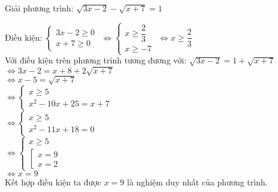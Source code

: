\begin{baitap}
 Giải phương trình: $ \sqrt{3x-2} - \sqrt{x+7} =1   $
 
\begin{loigiai1}
    Điều kiện: $ \begin{cases}
        3x -2 \geq 0 \\
        x + 7 \geq 0
    \end{cases} $
    $
    \Leftrightarrow
    \begin{cases}
        x \geq \dfrac{2}{3 } \\
        x \geq -7
    \end{cases} $
    $
    \Leftrightarrow
        x \geq \dfrac{2}{3 } $ \\
        
    Với điều kiện trên phương trinh tương đương với:
    $ \sqrt{3x -2 } = 1 + \sqrt{x+7}  $ \\
    $ \Leftrightarrow 3x -2 = x+8 + 2 \sqrt{x+7 }  $ \\
    $ \Leftrightarrow x -5 = \sqrt{x+7} $ \\
    $ \Leftrightarrow \begin{cases}
        x \geq 5 \\
        x^2 -10x + 25 = x +7
    \end{cases} $ \\
    $ \Leftrightarrow \begin{cases}
        x \geq 5 \\
        x^2 -11x + 18 =0
    \end{cases} $ \\
    $ \Leftrightarrow \begin{cases}
        x \geq 5 \\
        \left[
            \begin{array}{l}
                x=9 \\
                x=2 
            \end{array}
        \right. 
    \end{cases} $ \\
    $ \Leftrightarrow x=9 $ \\
    Kết hợp điều kiện ta được $ x=9 $ là nghiệm duy nhất của phương trình.
\end{loigiai1}
\end{baitap}
